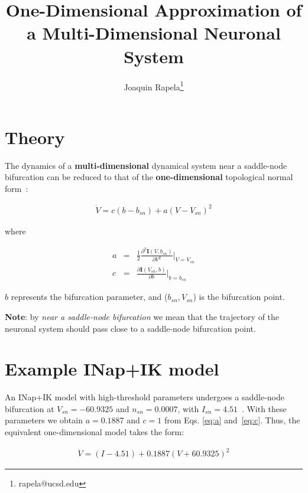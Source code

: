\documentclass{article}
\begin{document}
\title{One-Dimensional Approximation of a Multi-Dimensional Neuronal System}
\author{Joaquin Rapela\thanks{rapela@ucsd.edu}}

\maketitle

\section{Theory}

The dynamics of a \textbf{multi-dimensional} dynamical system near a
saddle-node bifurcation can be reduced to that of the \textbf{one-dimensional}
topological normal form~\citep[][p.163]{izhikevich07}:

\begin{eqnarray}
\dot{V}=c(b-b_{sn})+a(V-V_{sn})^2
\label{eq:qifModel}
\end{eqnarray}

\noindent where

\begin{eqnarray}
a&=&\frac{1}{2}\frac{\partial^2\mathbf{I}(V, b_{sn})}{\partial V^2}\Bigg|_{V=V_{sn}}
\label{eq:a}\\
c&=&\frac{\partial\mathbf{I}(V_{sn}, b)}{\partial b}\Bigg|_{b=b_{sn}}
\label{eq:c}
\end{eqnarray}

\noindent $b$ represents the bifurcation parameter, and ($b_{sn}, V_{sn}$) is
the bifurcation point.

\vspace{0.1in}

\noindent \textbf{Note}: by \emph{near a saddle-node bifurcation} we mean
that the trajectory of the neuronal system should pass close to a saddle-node
bifurcation point.

\section{Example INap+IK model}

An INap+IK model with high-threshold parameters undergoes a saddle-node
bifurcation at $V_{sn}=-60.9325$ and $n_{sn}=0.0007$, with
$I_{sn}=4.51$~\citep[][Example: The INap+IK-model on page 163]{izhikevich07}.
With these parameters we obtain $a=0.1887$ and $c=1$ from Eqs. \ref{eq:a}
and~\ref{eq:c}. Thus, the equivalent one-dimensional model takes the form:

\begin{eqnarray}
\dot{V}=(I-4.51)+0.1887(V+60.9325)^2
\end{eqnarray}
\end{document}
